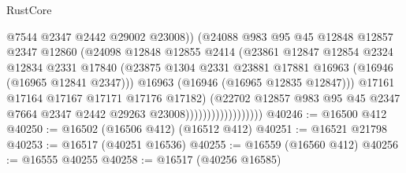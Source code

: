 \begin{lexlean}{RustCore}
\begin{coremodule}
                                        @7544
                                        @2347
                                        @2442
                                        @29002
                                        @23008))
                                    (@24088
                                      @983
                                      @95
                                      @45
                                      @12848
                                      @12857
                                      @2347
                                      @12860
                                      (@24098
                                        @12848
                                        @12855
                                        @2414
                                        (@23861
                                          @12847
                                          @12854
                                          @2324
                                          @12834
                                          @2331
                                          @17840
                                          (@23875
                                            @1304
                                            @2331
                                            @23881
                                            @17881
                                            @16963
                                            (@16946 (@16965 @12841 @2347)))
                                          @16963
                                          (@16946 (@16965 @12835 @12847)))
                                        @17161
                                        @17164
                                        @17167
                                        @17171
                                        @17176
                                        @17182)
                                      (@22702
                                        @12857
                                        @983
                                        @95
                                        @45
                                        @2347
                                        @7664
                                        @2347
                                        @2442
                                        @29263
                                        @23008))))))))))))))))))
@40246 := @16500 @412
@40250 := @16502 (@16506 @412) (@16512 @412)
@40251 := @16521 @21798
@40253 := @16517 (@40251 @16536)
@40255 := @16559 (@16560 @412)
@40256 := @16555 @40255
@40258 := @16517 (@40256 @16585)

\end{coremodule}
\end{lexlean}
